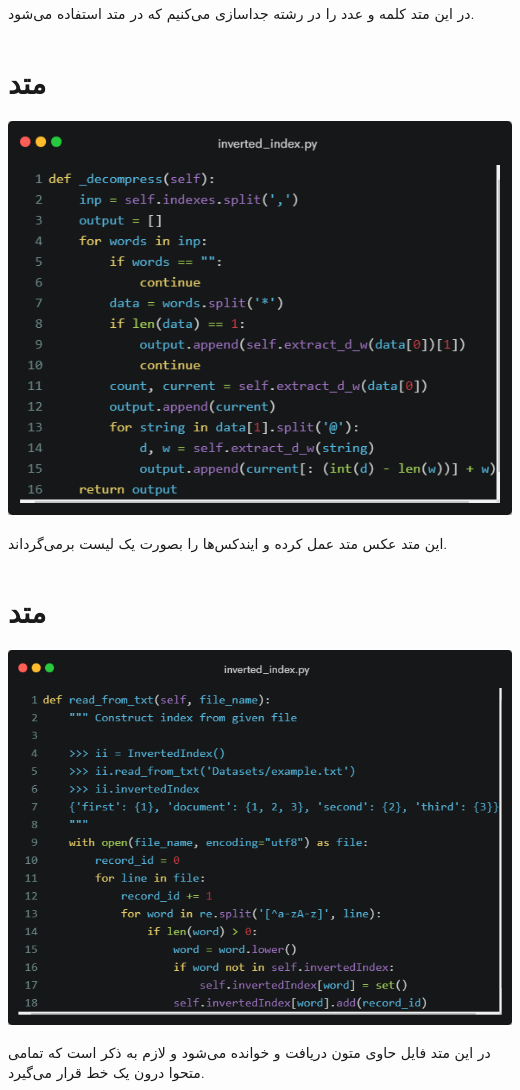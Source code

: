 \documentclass[12pt, dvipsnames, svgnames, x11names,]{article}
\begin{document}
		\vspace{0.5cm}
		{\normalsize 
			در این متد کلمه و عدد را در رشته جداسازی می‌کنیم که در متد  استفاده می‌شود.
		}		
		
		
	\section{متد }
		
		\includegraphics[width=14cm]{images/6.png} \par
		\vspace{0.5cm}
		{\normalsize 
			این متد عکس متد   عمل کرده و ایندکس‌ها را بصورت یک لیست برمی‌گرداند.
		}		
		
		
	\section{متد }
		
		\includegraphics[width=14cm]{images/7.png} \par
		\vspace{0.5cm}
		{\normalsize 
		در این متد فایل حاوی متون دریافت و خوانده می‌شود و لازم به ذکر است که تمامی متحوا درون یک خط قرار می‌گیرد.
		}		
		
\end{document}
